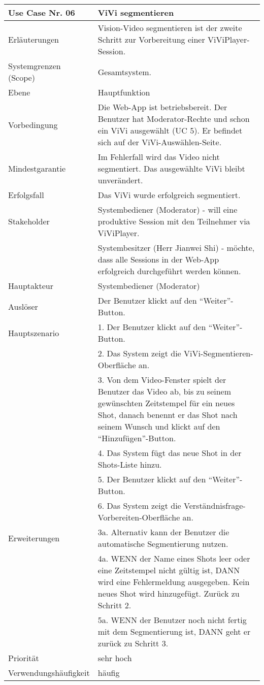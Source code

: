 \begin{tabularx}{\linewidth}{|l|X|}
	\hline
	Use Case Nr. 06			& \textbf{ViVi segmentieren} \\ \hline
	Erläuterungen			& Vision-Video segmentieren ist der zweite Schritt zur 
							  Vorbereitung einer ViViPlayer-Session. \\ \hline
	Systemgrenzen (Scope)	& Gesamtsystem. \\ \hline
	Ebene					& Hauptfunktion \\ \hline
	Vorbedingung			& Die Web-App ist betriebsbereit. Der Benutzer hat 
	                          Moderator-Rechte und schon ein ViVi ausgewählt (UC 5). Er  befindet sich auf der ViVi-Auswählen-Seite. \\ \hline
	Mindestgarantie			& Im Fehlerfall wird das Video nicht segmentiert. Das ausgewählte 
							  ViVi bleibt unverändert. \\ \hline
	Erfolgsfall 			& Das ViVi wurde erfolgreich segmentiert. \\ \hline
	Stakeholder				& Systembediener (Moderator) - will eine produktive Session mit den 
	                          Teilnehmer via ViViPlayer. \\
							& Systembesitzer (Herr Jianwei Shi) - möchte, dass alle Sessions 
							  in der Web-App erfolgreich durchgeführt werden können. \\ \hline
	Hauptakteur				& Systembediener (Moderator) \\ \hline
	Auslöser				& Der Benutzer klickt auf den ``Weiter''-Button. \\ \hline	
	Hauptszenario			& 1. Der Benutzer klickt auf den ``Weiter''-Button. \\
							& 2. Das System zeigt die ViVi-Segmentieren-Oberfläche an. \\
							& 3. Von dem Video-Fenster spielt der Benutzer das Video ab, bis 
							  zu seinem gewünschten Zeitstempel für ein neues Shot, danach 
							  benennt er das Shot nach seinem Wunsch und klickt auf den ``Hinzufügen''-Button. \\
							& 4. Das System fügt das neue Shot in der Shots-Liste 
							  hinzu. \\
							& 5. Der Benutzer klickt auf den ``Weiter''-Button. \\
							& 6. Das System zeigt die Verständnisfrage-Vorbereiten-Oberfläche 
							  an. \\ \hline
	Erweiterungen			& 3a. Alternativ kann der Benutzer die automatische 
							  Segmentierung nutzen. \\
							& 4a. WENN der Name eines Shots leer oder eine Zeitstempel 
							  nicht gültig ist, DANN wird eine Fehlermeldung ausgegeben. Kein neues Shot wird hinzugefügt. Zurück zu Schritt 2. \\ 
							& 5a. WENN der Benutzer noch nicht fertig mit dem Segmentierung 
							  ist, DANN geht er zurück zu Schritt 3. \\ \hline
	Priorität				& sehr hoch \\ \hline
	Verwendungshäufigkeit	& häufig \\ \hline
\end{tabularx}